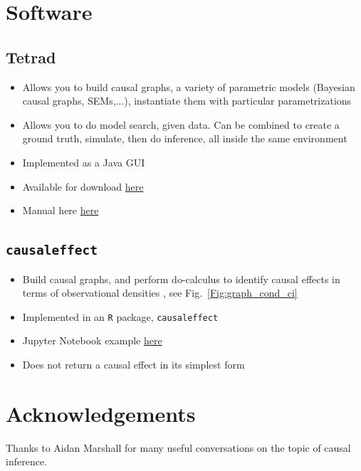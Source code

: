 \documentclass[11pt]{article}
\numberwithin{equation}{section}
\begin{document}
\section{Software}

\subsection{Tetrad}
\begin{itemize}[noitemsep]
\item Allows you to build causal graphs, a variety of parametric models (Bayesian causal graphs, SEMs,...), instantiate them with particular parametrizations
\item Allows you to do model search, given data. Can be combined to create a ground truth, simulate, then do inference, all inside the same environment
\item Implemented as a Java GUI
\item Available for download \href{https://www.ccd.pitt.edu/tools/}{here} 
\item Manual here \href{http://cmu-phil.github.io/tetrad/manual/}{here}
\end{itemize}

\subsection{\texttt{causaleffect}} \label{sec:soft-causaleffect}
\begin{itemize}[noitemsep]
\item Build causal graphs, and perform do-calculus to identify causal effects in terms of observational densities \cite{tikka17}, see Fig.~\ref{Fig:graph_cond_ci}
\item Implemented in an \texttt{R} package, \texttt{causaleffect}
\item Jupyter Notebook example \href{https://github.com/jaryaman/ML_demos/blob/master/Notebooks/do-calculus.ipynb}{here}
\item Does not return a causal effect in its simplest form
\end{itemize}

\section*{Acknowledgements}
Thanks to Aidan Marshall for many useful conversations on the topic of causal inference. 

\newpage
 
\end{document}
